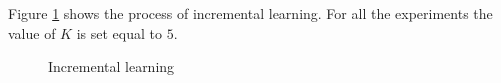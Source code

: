 \documentclass[preprint,3p,twocolumn]{elsarticle}
\begin{document}
Figure \ref{figure:Incremental-learning} shows the process of incremental learning. For all the experiments the value of $K$ is set equal to $5$.
\begin{figure}[h]
\centering
{}
\caption{\label{figure:Incremental-learning} Incremental learning}
\end{figure}
\end{document}
